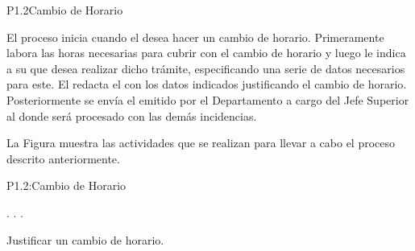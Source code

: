 

\begin{Proceso}{P1.2}{Cambio de Horario} {
  
    
    \smallskip
    \bigskip El proceso inicia cuando el  desea hacer un cambio de horario. Primeramente labora las horas necesarias para cubrir con el cambio de horario y luego le indica a su  que desea realizar dicho trámite, especificando una serie de datos necesarios para este. El  redacta el  con los datos indicados justificando el cambio de horario. 
    Posteriormente se envía el  emitido por el Departamento a cargo del Jefe Superior al  donde será procesado con las demás incidencias.
  
    
    \smallskip
    \noindent La Figura  muestra las actividades que se realizan para llevar a cabo el proceso descrito anteriormente.

    }{P1.2:Cambio de Horario}


     { %
        .
        .
        .
    }

     { %
        Justificar un cambio de horario.
    }


\end{Proceso}
